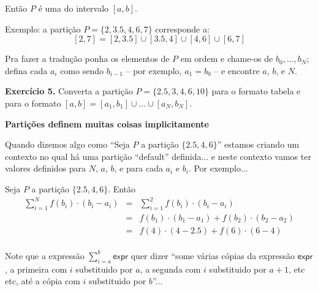 \documentclass[oneside,12pt]{article}
\begin{document}
Então $P$ é uma  do intervalo $[a,b]$.

\msk

Exemplo: a partição $P=\{2,3.5,4,6,7\}$ corresponde a:
%
$$[2,7] = [2,3.5]∪[3.5,4]∪[4,6]∪[6,7]$$

Pra fazer a tradução ponha os elementos de $P$ em ordem e chame-os de
$b_0,\ldots,b_N$; defina cada $a_i$ como sendo $b_{i-1}$ -- por
exemplo, $a_1 = b_0$ -- e encontre $a$, $b$, e $N$.

\msk

{\bf Exercício 5.} Converta a partição $P=\{2.5,3,4,6,10\}$ para o
formato tabela e para o formato $[a,b] = [a_1,b_1]∪\ldots∪[a_N,b_N].$



\newpage


{\bf Partições definem muitas coisas implicitamente}

Quando dizemos algo como ``Seja $P$ a partição $\{2.5,4,6\}$'' estamos
criando um contexto no qual há uma partição ``default'' definida... e
neste contexto vamos ter valores definidos para $N$, $a$, $b$, e para
cada $a_i$ e $b_i$. Por exemplo...

\msk

Seja $P$ a partição $\{2.5,4,6\}$. Então
%
$$\begin{array}{rcl}
  \sum_{i=1}^N f(b_i)·(b_i-a_i)
     &=& \sum_{i=1}^2 f(b_i)·(b_i-a_i) \\
     &=& f(b_1)·(b_1-a_1) + f(b_2)·(b_2-a_2) \\
     &=& f(4)·(4-2.5) + f(6)·(6-4) \\
  \end{array}
$$

\newpage


Note que a expressão $\sum_{i=a}^b \mathsf{expr}$ quer dizer ``some
várias cópias da expressão $\mathsf{expr}$, a primeira com $i$
substituido por $a$, a segunda com $i$ substituido por $a+1$, etc etc,
até a cópia com $i$ substituido por $b$''...
\end{document}

